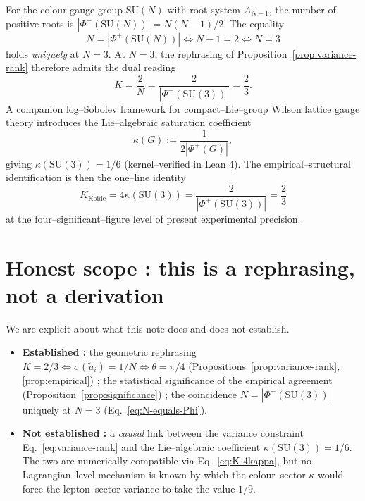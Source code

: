 \documentclass[11pt,a4paper]{article}
\theoremstyle{remark}
\begin{document}
For the colour gauge group $\mathrm{SU}(N)$ with root system $A_{N-1}$, the number of positive roots is $|\Phi^+(\mathrm{SU}(N))| = N(N-1)/2$. The equality
\begin{equation}
N = |\Phi^+(\mathrm{SU}(N))| \iff N - 1 = 2 \iff N = 3
\label{eq:N-equals-Phi}
\end{equation}
holds \emph{uniquely} at $N = 3$. At $N = 3$, the rephrasing of Proposition~\ref{prop:variance-rank} therefore admits the dual reading
\begin{equation}
K = \frac{2}{N} = \frac{2}{|\Phi^+(\mathrm{SU}(3))|} = \frac{2}{3}.
\end{equation}
A companion log--Sobolev framework for compact--Lie--group Wilson lattice gauge theory \cite{Remondiere2026b} introduces the Lie--algebraic saturation coefficient
\begin{equation}
\kappa(G) := \frac{1}{2|\Phi^+(G)|},
\end{equation}
giving $\kappa(\mathrm{SU}(3)) = 1/6$ (kernel--verified in Lean 4). The empirical--structural identification is then the one--line identity
\begin{equation}
K_{\mathrm{Koide}} = 4\kappa(\mathrm{SU}(3)) = \frac{2}{|\Phi^+(\mathrm{SU}(3))|} = \frac{2}{3}
\label{eq:K-4kappa}
\end{equation}
at the four--significant--figure level of present experimental precision.

\section{Honest scope : this is a rephrasing, not a derivation}

We are explicit about what this note does and does not establish.

\begin{itemize}
\item \textbf{Established :} the geometric rephrasing $K = 2/3 \iff \sigma(\tilde u_i) = 1/N \iff \theta = \pi/4$ (Propositions~\ref{prop:variance-rank}, \ref{prop:empirical}) ; the statistical significance of the empirical agreement (Proposition~\ref{prop:significance}) ; the coincidence $N = |\Phi^+(\mathrm{SU}(3))|$ uniquely at $N = 3$ (Eq.~\ref{eq:N-equals-Phi}).

\item \textbf{Not established :} a \emph{causal} link between the variance constraint Eq.~\ref{eq:variance-rank} and the Lie--algebraic coefficient $\kappa(\mathrm{SU}(3)) = 1/6$. The two are numerically compatible via Eq.~\ref{eq:K-4kappa}, but no Lagrangian--level mechanism is known by which the colour--sector $\kappa$ would force the lepton--sector variance to take the value $1/9$.
\end{itemize}
\end{document}

